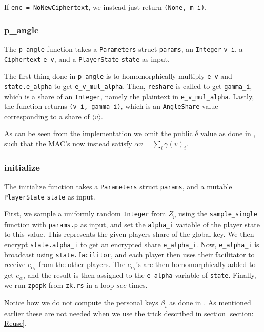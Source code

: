 \documentclass[../main.tex]{subfiles}
\begin{document}
If \lstinline{enc = NoNewCiphertext}, we instead just return \lstinline{(None, m_i)}.

\subsubsection{p\_angle}
The \lstinline{p_angle} function takes a \lstinline{Parameters} struct \lstinline{params}, an \lstinline{Integer} \lstinline{v_i}, a \lstinline{Ciphertext} \lstinline{e_v}, and a \lstinline{PlayerState} \lstinline{state} as input.

The first thing done in \lstinline{p_angle} is to homomorphically multiply \lstinline{e_v} and \lstinline{state.e_alpha} to get \lstinline{e_v_mul_alpha}. Then, \lstinline{reshare} is called to get \lstinline{gamma_i}, which is a share of an \lstinline{Integer}, namely the plaintext in \lstinline{e_v_mul_alpha}. Lastly, the function returns \lstinline{(v_i, gamma_i)}, which is an \lstinline{AngleShare} value corresponding to a share of $\langle v \rangle$.

As can be seen from the implementation we omit the public $\delta$ value as done in \cite{damgaard2013practical}, such that the MAC's now instead satisfy $\alpha v = \sum_i \gamma(v)_i$.
 
\subsubsection{initialize}
The initialize function takes a \lstinline{Parameters} struct \lstinline{params}, and a mutable \lstinline{PlayerState} \lstinline{state} as input.

First, we sample a uniformly random \lstinline{Integer} from $Z_p$ using the \lstinline{sample_single} function with \lstinline{params.p} as input, and set the \lstinline{alpha_i} variable of the player state to this value. This represents the given players share of the global key. We then encrypt \lstinline{state.alpha_i} to get an encrypted share \lstinline{e_alpha_i}. Now, \lstinline{e_alpha_i} is broadcast using \lstinline{state.facilitor}, and each player then uses their facilitator to receive $e_{\alpha_i}$ from the other players. The $e_{\alpha_i}$'s are then homomorphically added to get $e_\alpha$, and the result is then assigned to the \lstinline{e_alpha} variable of \lstinline{state}. %
Finally, we run \lstinline{zpopk} from \lstinline{zk.rs} in a loop $sec$ times.

Notice how we do not compute the personal keys $\beta_i$ as done in \cite{damgaard2012multiparty}. As mentioned earlier these are not needed when we use the trick described in section \ref{section: Reuse}.
\end{document}
